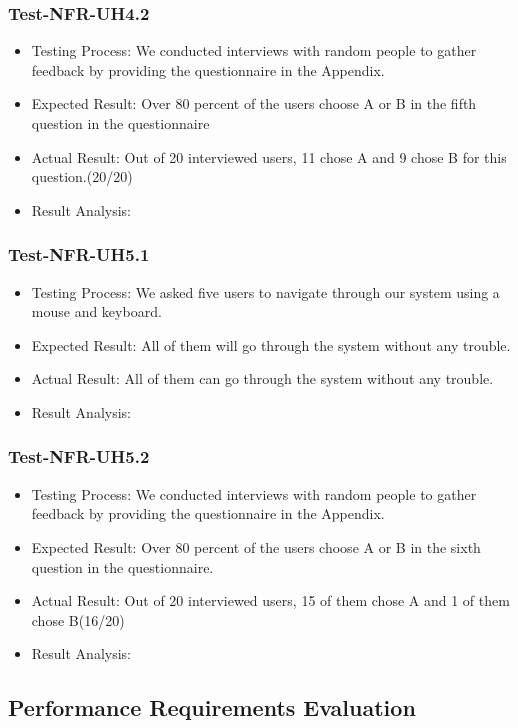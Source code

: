 \documentclass[12pt, titlepage]{article}
\begin{document}
\subsubsection{Test-NFR-UH4.2}
\begin{itemize}
    \item Testing Process: We conducted interviews with random people to gather feedback by providing the questionnaire in the Appendix.
    \item Expected Result: Over 80 percent of the users choose A or B in the fifth question in the questionnaire
    \item Actual Result: Out of 20 interviewed users, 11 chose A and 9 chose B for this question.(20/20)
    \item Result Analysis: \pass
\end{itemize}

\subsubsection{Test-NFR-UH5.1}
\begin{itemize}
    \item Testing Process: We asked five users to navigate through our system using a mouse and keyboard.
    \item Expected Result: All of them will go through the system without any trouble.
    \item Actual Result: All of them can go through the system without any trouble.
    \item Result Analysis: \pass
\end{itemize}

\subsubsection{Test-NFR-UH5.2}
\begin{itemize}
    \item Testing Process: We conducted interviews with random people to gather feedback by providing the questionnaire in the Appendix.
    \item Expected Result: Over 80 percent of the users choose A or B in the sixth question in the questionnaire.
    \item Actual Result: Out of 20 interviewed users, 15 of them chose A and 1 of them chose B(16/20)
    \item Result Analysis: \pass
\end{itemize}
\subsection{Performance Requirements Evaluation}
\end{document}
